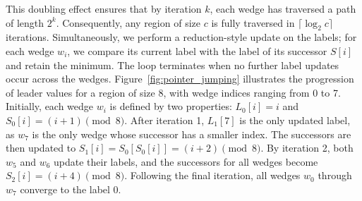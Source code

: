 \begin{enumerate}
    This doubling effect ensures that by iteration $k$, each wedge has traversed a path of length $2^k$. Consequently, any region of size $c$ is fully traversed in $\lceil \log_2 c \rceil$ iterations. Simultaneously, we perform a reduction-style update on the labels; for each wedge $w_i$, we compare its current label with the label of its successor $S[i]$ and retain the minimum. The loop terminates when no further label updates occur across the wedges. Figure~\ref{fig:pointer_jumping} illustrates the progression of leader values for a region of size 8, with wedge indices ranging from 0 to 7. Initially, each wedge $w_i$ is defined by two properties: $L_0[i] = i$ and $S_0[i] = (i + 1) \pmod{8}$. After iteration 1, $L_1[7]$ is the only updated label, as $w_7$ is the only wedge whose successor has a smaller index. The successors are then updated to $S_1[i] = S_0[S_0[i]] = (i + 2) \pmod{8}$. By iteration 2, both $w_5$ and $w_6$ update their labels, and the successors for all wedges become $S_2[i] = (i + 4) \pmod{8}$. Following the final iteration, all wedges $w_0$ through $w_7$ converge to the label 0.



\end{enumerate}
